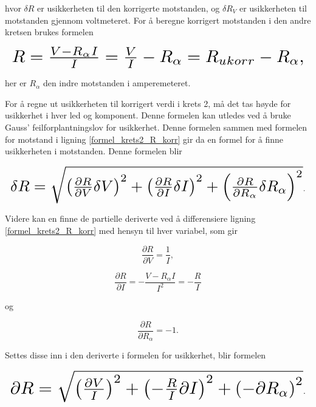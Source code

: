 \documentclass[twocolumn, a4paper, 11pt]{article} %
\begin{document}
hvor $\delta R$ er usikkerheten til den korrigerte motstanden, og $\delta R_V$ er usikkerheten til motstanden gjennom voltmeteret. For å beregne korrigert motstanden i den andre kretsen brukes formelen

\begin{equation}
\resizebox{1.0\hsize}{!}{$
    R = \frac{V - R_\alpha I}{I} = \frac{V}{I} - R_\alpha = R_{ukorr} - R_\alpha,
    \label{formel_krets2_R_korr}
    $}
\end{equation}

her er $R_\alpha$ den indre motstanden i amperemeteret. 

\bigskip

For å regne ut usikkerheten til korrigert verdi i krets 2, må det tas høyde for usikkerhet i hver led og komponent. Denne formelen kan utledes ved å bruke Gauss’ feilforplantningslov for usikkerhet. Denne formelen sammen med formelen for motstand i ligning \eqref{formel_krets2_R_korr} gir da en formel for å finne usikkerheten i motstanden. Denne formelen blir

\begin{equation}
\resizebox{1.0\hsize}{!}{$
\delta R = \sqrt{{\left(\frac{\partial R}{\partial V}  \delta V \right)}^2 + {\left(\frac{\partial R}{\partial I} \delta I\right)}^2+ {\left(\frac{\partial R}{\partial R_\alpha} \delta R_\alpha \right)}^2}
$}.
\label{usikkerhet_R}
\end{equation}

Videre kan en finne de partielle deriverte ved å differensiere ligning \eqref{formel_krets2_R_korr} med hensyn til hver variabel, som gir 

\begin{equation}
    \frac{\partial R}{\partial V}= \frac{1}{I}
    \label{partialderiverte_V_2},
\end{equation}

\begin{equation}
    \frac{\partial R}{\partial I}= -\frac{V -R_\alpha I}{I^2}= -\frac{R}{I}
    \label{partialderiverte_I}
\end{equation}

og

\begin{equation}
    \frac{\partial R}{\partial R_\alpha}= -1
    \label{partialderiverte_R_alpha}.
  \end{equation}


Settes disse inn i den deriverte i formelen for usikkerhet, blir formelen


\begin{equation}
\resizebox{1.0\hsize}{!}{$
    \partial R = \sqrt{{\left(\frac{\partial V}{I}\right)}^2 + {\left(-\frac{R}{I} \partial I\right)}^2 + {\left(-\partial R_\alpha \right)}^2}
    $}.
    \label{partialderiverte_satt_inn}
\end{equation}
\end{document}
